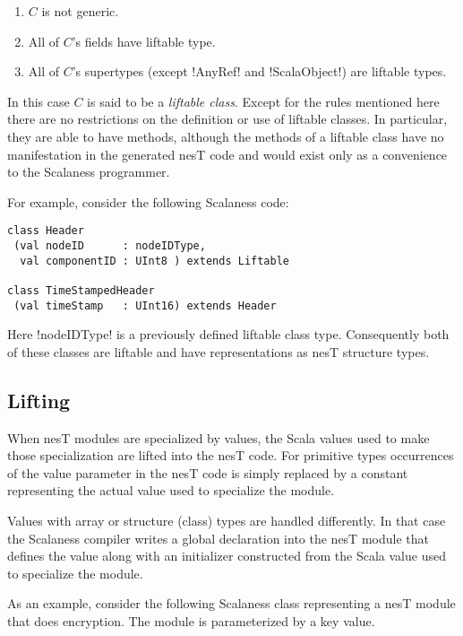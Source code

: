 \begin{enumerate}
\item $C$ is not generic.
\item All of $C$'s fields have liftable type.
\item All of $C$'s supertypes (except !AnyRef! and !ScalaObject!) are liftable types.
\end{enumerate}

In this case $C$ is said to be a \textit{liftable class}. Except for the rules mentioned here
there are no restrictions on the definition or use of liftable classes. In particular, they are
able to have methods, although the methods of a liftable class have no manifestation in the
generated nesT code and would exist only as a convenience to the Scalaness programmer.

For example, consider the following Scalaness code:

\singlespace
\begin{lstlisting}[language=scalaness]
class Header
 (val nodeID      : nodeIDType,
  val componentID : UInt8 ) extends Liftable

class TimeStampedHeader
 (val timeStamp   : UInt16) extends Header
\end{lstlisting}
\primaryspacing

Here !nodeIDType! is a previously defined liftable class type. Consequently both of these
classes are liftable and have representations as nesT structure types.


\subsection{Lifting}
\label{section-lifting}

When nesT modules are specialized by values, the Scala values used to make those specialization
are lifted into the nesT code. For primitive types occurrences of the value parameter in the
nesT code is simply replaced by a constant representing the actual value used to specialize the
module.

Values with array or structure (class) types are handled differently. In that case the Scalaness
compiler writes a global declaration into the nesT module that defines the value along with an
initializer constructed from the Scala value used to specialize the module.

As an example, consider the following Scalaness class representing a nesT module that does
encryption. The module is parameterized by a key value.

